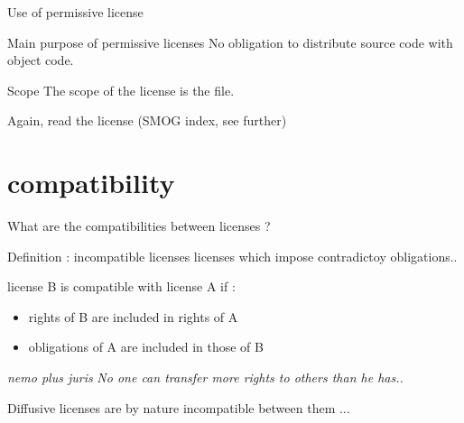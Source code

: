 \documentclass{beamer}
\begin{document}
\begin{frame}{Use of permissive license}

  \begin{block}{Main purpose of permissive licenses}
    No obligation to distribute source code with object code.
  \end{block}

  \begin{alertblock}{Scope}
 	The scope of the license is the file.
  \end{alertblock}

 Again, read the license (SMOG index, see further)
\end{frame}


\section{compatibility}

\begin{frame}{What are the compatibilities between licenses ?}

  \begin{block}{Definition : incompatible licenses}
    licenses which impose contradictoy obligations.. 
  \end{block}

  \begin{alertblock}{license B is compatible with license A if :}
    \begin{itemize}
    \item rights of B are included in rights of A
    \item obligations of A are included in those of B
    \end{itemize}
  \end{alertblock}

\pause

\begin{alertblock}{\textit{nemo plus juris}}
  \textit{No one can transfer more rights to others than he has..}
\end{alertblock}

Diffusive licenses are by nature incompatible between them ...

\end{frame}
\end{document}
